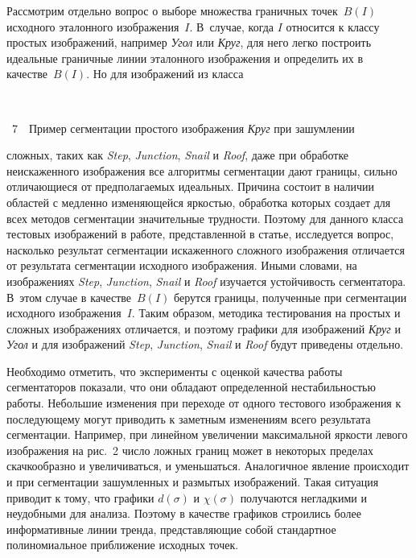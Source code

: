 \begin{multicols}{2}
  
  Рассмотрим отдельно вопрос о выборе множества граничных точек~$B(I)$ 
исходного эталонного изображения~$I$. В~случае, когда $I$ относится к 
классу простых изображений, например \textit{Угол} или \textit{Круг}, для него 
легко построить идеальные граничные линии эталонного изображения и 
определить их в качестве~$B(I)$. Но для изображений из класса\linebreak
\begin{center} %
\vspace*{1pt}
\mbox{%
\epsfxsize=53.905mm
}
\end{center}
\vspace*{6pt}
{{\figurename~7}\ \ \small{Пример сегментации простого изображения \textit{Круг} при зашумлении}}

\addtocounter{figure}{1}

\noindent
 сложных, 
таких как \textit{Step}, \textit{Junction}, \textit{Snail} и \textit{Roof}, даже при 
обработке неискаженного изображения все алгоритмы сегментации дают 
границы, сильно отличающиеся от предполагаемых идеальных. Причина 
состоит в наличии областей с медленно изменяющейся яркостью, обработка 
которых создает для всех методов сегментации значительные трудности. 
Поэтому для данного класса тестовых изображений в работе, представленной в 
статье, исследуется вопрос, насколько результат сегментации искаженного 
сложного изображения отличается от результата сегментации исходного 
изображения. Иными словами, на изображениях \textit{Step}, \textit{Junction}, 
\textit{Snail} и \textit{Roof} изучается устойчивость сегментатора. В~этом случае 
в качестве~$B(I)$ берутся границы, полученные при сегментации исходного 
изображения~$I$. Таким образом, методика тестирования на простых и 
сложных изображениях отличается, и поэтому графики для изображений 
\textit{Круг} и \textit{Угол} и для изображений \textit{Step}, \textit{Junction}, 
\textit{Snail} и \textit{Roof} будут приведены отдельно.
  
  Необходимо отметить, что эксперименты с оценкой качества работы 
сегментаторов показали, что они обладают определенной нестабильностью 
работы. Небольшие изменения при переходе от одного тестового изображения 
к последующему могут приводить к заметным изменениям всего результата 
сегментации. Например, при линейном увеличении максимальной яркости 
левого изображения на рис.~2 число ложных границ может в некоторых 
пределах скачкообразно и увеличиваться, и уменьшаться. Аналогичное явление 
происходит и при сегментации зашумленных и размытых изоб\-ра\-же\-ний. Такая 
ситуация приводит к тому, что графики $d(\sigma)$ и $\chi(\sigma)$ получаются 
негладкими и неудобными для анализа. Поэтому в качестве графиков строились 
более информативные линии тренда, пред\-став\-ля\-ющие собой стандартное 
полиномиальное приближение исходных точек.
  

\end{multicols}
